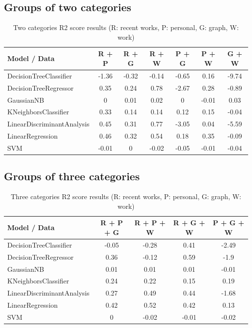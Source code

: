 \FloatBarrier
\subsection{Groups of two categories}
\begin{table}[!hbt]
	\begin{center}
	\caption{Two categories R2 score results (R: recent works, P: personal, G: graph, W: work)}
	\label{tab:twoCategories}
	\begin{tabular}{|l|c|c|c|c|c|c|}
		\hline
		Model / Data & R + P & R + G & R + W & P + G & P + W & G + W\\
		\hline
		DecisionTreeClassifier & -1.36 & -0.32 & -0.14 & -0.65 & 0.16 & -9.74 \\
		\hline
		DecisionTreeRegressor & 0.35 & 0.24 & 0.78 & -2.67 & 0.28 & -0.89 \\
		\hline
		GaussianNB & 0 & 0.01 & 0.02 & 0 & -0.01 & 0.03 \\
		\hline
		KNeighborsClassifier & 0.33 & 0.14 & 0.14 & 0.12 & 0.15 & -0.04 \\
		\hline
		LinearDiscriminantAnalysis & 0.45 & 0.31 & 0.77 & -3.05 & 0.04 & -5.59 \\
		\hline
		LinearRegression & 0.46 & 0.32 & 0.54 & 0.18 & 0.35 & -0.09 \\
		\hline
		SVM & -0.01 & 0 & -0.02 & -0.05 & -0.01 & -0.04 \\
		\hline
	\end{tabular}
	\end{center}
\end{table}

\FloatBarrier
\subsection{Groups of three categories}
\begin{table}[!hbt]
	\begin{center}
	\caption{Three categories R2 score results (R: recent works, P: personal, G: graph, W: work)}
	\label{tab:threeCategories}
	\begin{tabular}{|l|c|c|c|c|}
		\hline
		Model / Data & R + P + G & R + P + W & R + G + W & P + G + W \\
		\hline
		DecisionTreeClassifier & -0.05 & -0.28 & 0.41 & -2.49 \\
		\hline
		DecisionTreeRegressor & 0.36 & -0.12 & 0.59 & -1.9 \\
		\hline
		GaussianNB & 0.01 & 0.01 & 0.01 & -0.01 \\
		\hline
		KNeighborsClassifier & 0.24 & 0.22 & 0.15 & 0.19 \\
		\hline
		LinearDiscriminantAnalysis & 0.27 & 0.49 & 0.44 & -1.68 \\
		\hline
		LinearRegression & 0.42 & 0.52 & 0.42 & 0.13 \\
		\hline
		SVM & 0 & -0.02 & -0.01 & -0.02 \\
		\hline
	\end{tabular}
	\end{center}
\end{table}

